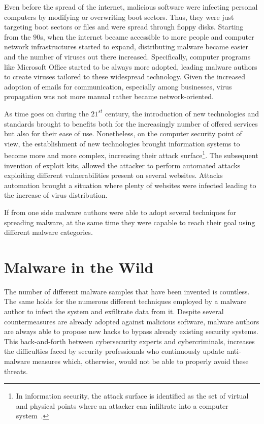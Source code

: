 \documentclass[LaM,binding=0.6cm]{sapthesis}
\begin{document}
Even before the spread of the internet, malicious software were infecting personal computers by modifying or overwriting boot sectors. Thus, they were just targeting boot sectors or files and were spread through floppy disks. Starting from the $90$s, when the internet became accessible to more people and computer network infrastructures started to expand, distributing malware became easier and the number of viruses out there increased. Specifically, computer programs like Microsoft Office started to be always more adopted, leading malware authors to create viruses tailored to these widespread technology. Given the increased adoption of emails for communication, especially among businesses, virus propagation was not more manual rather became network-oriented.

As time goes on during the $21^{st}$ century, the introduction of new technologies and standards brought to benefits both for the increasingly number of offered services but also for their ease of use. Nonetheless, on the computer security point of view, the establishment of new technologies brought information systems to become more and more complex, increasing their attack surface\footnote{In information security, the attack surface is identified as the set of virtual and physical points where an attacker can infiltrate into a computer system~\cite{AttackSu36:online}.}. The subsequent invention of exploit kits, allowed the attacker to perform automated attacks exploiting different vulnerabilities present on several websites. Attacks automation brought a situation where plenty of websites were infected leading to the increase of virus distribution.

If from one side malware authors were able to adopt several techniques for spreading malware, at the same time they were capable to reach their goal using different malware categories. 

\section{Malware in the Wild}
\label{sec:malwareinthewild}
The number of different malware samples that have been invented is countless. The same holds for the numerous different techniques employed by a malware author to infect the system and exfiltrate data from it. Despite several countermeasures are already adopted against malicious software, malware authors are always able to propose new hacks to bypass already existing security systems. This back-and-forth between cybersecurity experts and cybercriminals, increases the difficulties faced by security professionals who continuously update anti-malware measures which, otherwise, would not be able to properly avoid these threats.
\end{document}
